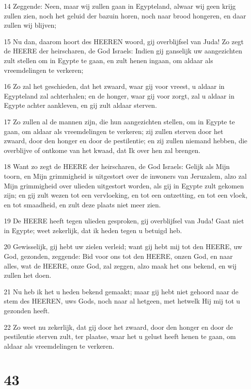 \par 14 Zeggende: Neen, maar wij zullen gaan in Egypteland, alwaar wij geen krijg zullen zien, noch het geluid der bazuin horen, noch naar brood hongeren, en daar zullen wij blijven;
\par 15 Nu dan, daarom hoort des HEEREN woord, gij overblijfsel van Juda! Zo zegt de HEERE der heirscharen, de God Israels: Indien gij ganselijk uw aangezichten zult stellen om in Egypte te gaan, en zult henen ingaan, om aldaar als vreemdelingen te verkeren;
\par 16 Zo zal het geschieden, dat het zwaard, waar gij voor vreest, u aldaar in Egypteland zal achterhalen; en de honger, waar gij voor zorgt, zal u aldaar in Egypte achter aankleven, en gij zult aldaar sterven.
\par 17 Zo zullen al de mannen zijn, die hun aangezichten stellen, om in Egypte te gaan, om aldaar als vreemdelingen te verkeren; zij zullen sterven door het zwaard, door den honger en door de pestilentie; en zij zullen niemand hebben, die overblijve of ontkome van het kwaad, dat Ik over hen zal brengen.
\par 18 Want zo zegt de HEERE der heirscharen, de God Israels: Gelijk als Mijn toorn, en Mijn grimmigheid is uitgestort over de inwoners van Jeruzalem, alzo zal Mijn grimmigheid over ulieden uitgestort worden, als gij in Egypte zult gekomen zijn; en gij zult wezen tot een vervloeking, en tot een ontzetting, en tot een vloek, en tot smaadheid, en zult deze plaats niet meer zien.
\par 19 De HEERE heeft tegen ulieden gesproken, gij overblijfsel van Juda! Gaat niet in Egypte; weet zekerlijk, dat ik heden tegen u betuigd heb.
\par 20 Gewisselijk, gij hebt uw zielen verleid; want gij hebt mij tot den HEERE, uw God, gezonden, zeggende: Bid voor ons tot den HEERE, onzen God, en naar alles, wat de HEERE, onze God, zal zeggen, alzo maak het ons bekend, en wij zullen het doen.
\par 21 Nu heb ik het u heden bekend gemaakt; maar gij hebt niet gehoord naar de stem des HEEREN, uws Gods, noch naar al hetgeen, met hetwelk Hij mij tot u gezonden heeft.
\par 22 Zo weet nu zekerlijk, dat gij door het zwaard, door den honger en door de pestilentie sterven zult, ter plaatse, waar het u gelust heeft henen te gaan, om aldaar als vreemdelingen te verkeren.

\chapter{43}

